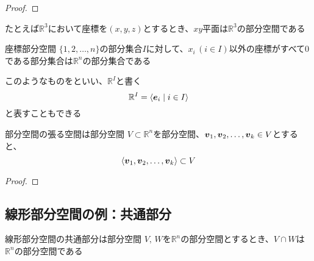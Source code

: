 \documentclass[../../../topic_linear-algebra]{subfiles}
\begin{document}
\begin{proof}
\end{proof}

\br

たとえば$\mathbb{R}^3$において座標を$(x, y, z)$とするとき、$xy$平面は$\mathbb{R}^3$の部分空間である

\begin{definition}{座標部分空間}
  $\{1, 2, \dots, n\}$の部分集合$I$に対して、$x_i \, (i \in I)$以外の座標がすべて0である部分集合は$\mathbb{R}^n$の部分集合である

  このようなものをといい、$\mathbb{R}^I$と書く
  \begin{equation*}
    \mathbb{R}^I = \langle \vb*{e}_i \mid i \in I \rangle
  \end{equation*}
  と表すこともできる
\end{definition}

\br

\begin{theorem}{部分空間の張る空間は部分空間}
  $V \subset \mathbb{R}^n$を部分空間、$\vb*{v}_1, \vb*{v}_2, \dots, \vb*{v}_k \in V$とすると、
  \begin{equation*}
    \langle \vb*{v}_1, \vb*{v}_2, \dots, \vb*{v}_k \rangle \subset V
  \end{equation*}
\end{theorem}

\begin{proof}
\end{proof}

\subsection{線形部分空間の例：共通部分}

\begin{theorem}{線形部分空間の共通部分は部分空間}
  $V,\,W$を$\mathbb{R}^n$の部分空間とするとき、$V \cap W$は$\mathbb{R}^n$の部分空間である
\end{theorem}
\end{document}
